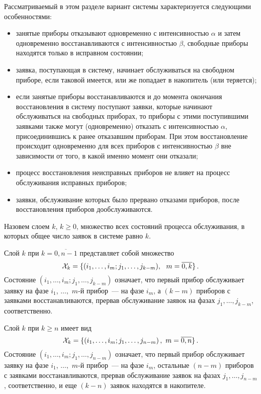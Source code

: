 \begin{multicols}{2}
Рассматриваемый в этом разделе вариант системы характеризуется
следующими особенностями:
\begin{itemize}
\item
занятые приборы отказывают одновременно с интенсивностью $\alpha$
и затем одновременно восстанавливаются с интенсивностью $\beta$,
свободные приборы находятся только в исправном состоянии;
\item
заявка, поступающая в систему, начинает обслуживаться на свободном
приборе, если таковой имеется, или же попадает в накопитель (или
теряется);
\item
если занятые приборы восстанавливаются и до момента окончания
восстановления в систему поступают заявки, которые начинают
обслуживаться на свободных приборах, то приборы с этими поступившими
заявками также могут (одновременно) отказать с интенсивностью $\alpha$,
присоединившись к ранее отказавшим приборам.
При этом восстановление
происходит одновременно для всех приборов с ин\-тен\-сив\-ностью $\beta$
вне зависимости от того, в какой именно момент они отказали;
\item
процесс восстановления неисправных приборов не влияет на процесс
обслуживания исправных приборов;
\item
заявки, обслуживание которых было прервано отказами приборов,
после восстановления приборов дообслуживаются.
\end{itemize}

Назовем слоем $k$, $k\ge 0$, множество всех состояний процесса
обслуживания, в которых общее число заявок в системе равно $k$.

Слой $k$ при $k=\overline{0,n-1}$ представляет собой множество
\begin{equation*}
{\cal X}_k
=
\{(i_1,\ldots,i_m;j_1,\ldots,j_{k-m}),\ \ m=\overline{0,k}\}\,.
\end{equation*}
Состояние $(i_1,\ldots,i_m;j_1,\ldots,j_{k-m})$ означает, что первый
прибор обслуживает заявку на фазе $i_1$, $\ldots,$ $m$-й прибор~---
на фазе $i_m$, а $(k-m)$ приборов с заявками восстанавливаются,
прервав обслуживание заявок на фазах $j_1,\ldots,j_{k-m}$,
соответственно.

Слой $k$ при $k \ge n$ имеет вид
\begin{equation*}
{\cal X}_k
=
\{(i_1,\ldots,i_m;j_1,\ldots,j_{n-m})\,, \ m=\overline{0,n}\}\,.
\end{equation*}
Состояние $(i_1,\ldots,i_m;j_1,\ldots,j_{n-m})$ означает, что
первый прибор обслуживает заявку на фазе $i_1$, $\ldots,$
$m$-й прибор~--- на фазе $i_m$, остальные $(n-m)$ приборов с
заявками восстанавливаются, прервав обслу\-жи\-ва\-ние заявок на фазах
$j_1,\ldots,j_{n-m}$, соответственно, и еще $(k-n)$ заявок находятся
в накопителе.


\end{multicols}
